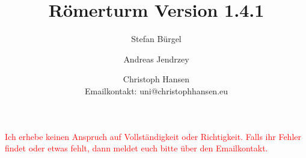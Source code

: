 \documentclass[a5paper,9pt,fleqn,twoside]{scrartcl}
\title{Römerturm Version 1.4.1}
\author{Stefan Bürgel \and Andreas Jendrzey \and Christoph Hansen \\ 
Emailkontakt: uni@christophhansen.eu}
\date{}
\begin{document}
\thispagestyle{empty}
\cleardoublepage
\maketitle


\textcolor{red}{Ich erhebe keinen Anspruch auf Vollständigkeit oder Richtigkeit. Falls ihr Fehler findet oder etwas fehlt, dann meldet euch bitte über den Emailkontakt.}

\setcounter{page}{1}
\begin{multicols}{2}
	\tableofcontents
\end{multicols}
	\pagebreak
	
	
	
	
	
	
	
	
\pagestyle{empty}
\clearpage
\section*{ }
\clearpage
\section*{ }
\end{document}
